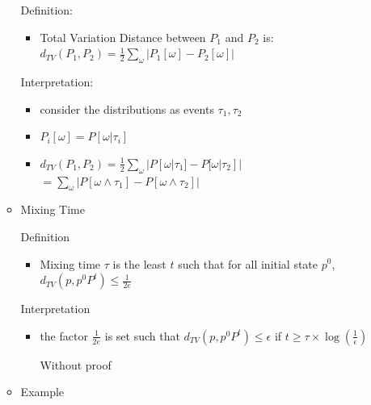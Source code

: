 \documentclass[a4paper]{article}
\begin{document}
\begin{itemize}
\begin{itemize}
                Definition:
                \begin{itemize}
                    \item Total Variation Distance between $P_1$ and $P_2$ is: $d_{\mathit{TV}}(P_1, P_2) = \frac{1}{2} \sum_{\omega} |P_1[\omega] - P_2[\omega]|$
                \end{itemize}
                Interpretation:
                \begin{itemize}
                    \item consider the distributions as events $\tau_1, \tau_2$
                    \item $P_i[\omega] = P[\omega|\tau_i]$
                    \item $d_{\mathit{TV}}(P_1, P_2) = \frac{1}{2} \sum_{\omega} |P[\omega | \tau_1] - P[\omega | \tau_2]|$
                        $= \sum_{\omega} |P[\omega \wedge \tau_1] - P[\omega \wedge \tau_2]|$
                \end{itemize}
            \item Mixing Time

                Definition
                \begin{itemize}
                    \item Mixing time $\tau$ is the least $t$ such that for all initial state $p^0$, $d_\mathit{TV}(p, p^0P^t) \leq \frac{1}{2e}$
                \end{itemize}
                Interpretation
                \begin{itemize}
                    \item the factor $\frac{1}{2e}$ is set such that $d_\mathit{TV}(p, p^0P^t) \leq \epsilon$ if $t \geq \tau \times \log(\frac{1}{\epsilon})$

                        Without proof
                \end{itemize}
            \item Example


\end{itemize}
\end{itemize}
\end{document}
